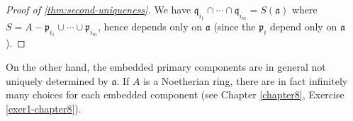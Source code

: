 \begin{proof}[Proof of \eqref{thm:second-uniqueness}]
    We have $\mathfrak{q}_{i_1} \cap \cdots \cap \mathfrak{q}_{i_m} = S(\mathfrak{a})$ where $S = A - \mathfrak{p}_{i_1} \cup \cdots \cup \mathfrak{p}_{i_m}$, hence depends only on $\mathfrak{a}$ (since the $\mathfrak{p}_i$ depend only on $\mathfrak{a}$). 
\end{proof}

\begin{remark}
On the other hand, the embedded primary components are in general not uniquely determined by $\mathfrak{a}$. If $A$ is a Noetherian ring, there are in fact infinitely many choices for each embedded component (see Chapter \ref{chapter8}, Exercise \ref{exer1-chapter8}).
\end{remark}


